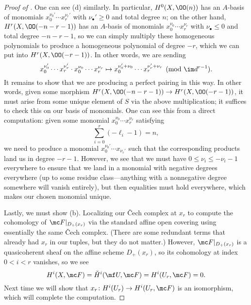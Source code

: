 \documentclass[../notes.tex]{subfiles}
\begin{document}
\begin{proof}[Proof of ]
	One can see (d) similarly. In particular, $H^0(X,\OO(n))$ has an $A$-basis of monomials $x_0^{\nu_0'}\cdots x_r^{\nu_r'}$ with $\nu_\bullet'\ge0$ and total degree $n$; on the other hand, $H^r(X,\OO(-n-r-1))$ has an $A$-basis of monomials $x_0^{\nu_0}\cdots x_r^{\nu_r}$ with $\nu_\bullet\le0$ and total degree $-n-r-1$, so we can simply multiply these homogeneous polynomials to produce a homogeneous polynomial of degree $-r$, which we can put into $H^r(X,\OO(-r-1))$. In other words, we are sending
	\[x_0^{\nu_0'}\cdots x_r^{\nu_r'}\cdot x_0^{\nu_0}\cdots x_r^{\nu_r}\mapsto x_0^{\nu_0'+\nu_0}\cdots x_r^{\nu_r'+\nu_r}\pmod{\im d^{r-1}}.\]
	It remains to show that we are producing a perfect pairing in this way. In other words, given some morphism $H^r(X,\OO(-n-r-1))\to H^r(X,\OO(-r-1))$, it must arise from some unique element of $S$ via the above multiplication; it suffices to check this on our basis of monomials. One can see this from a direct computation: given some monomial $x_0^{\nu_0}\cdots x_r^{\nu_r}$ satisfying
	\[\sum_{i=0}^r(-\ell_i-1)=n,\]
	we need to produce a monomial $x_0^{\nu_0'}\cdots x_{\nu_r'}$ such that the corresponding products land us in degree $-r-1$. However, we see that we must have $0\le\nu_i\le-\nu_i-1$ everywhere to ensure that we land in a monomial with negative degrees everywhere (up to some residue class---anything with a nonnegative degree somewhere will vanish entirely), but then equalities must hold everywhere, which makes our chosen monomial unique.

	Lastly, we must show (b). Localizing our \v Cech complex at $x_r$ to compute the cohomology of $\mc F|_{D_+(x_r)}$ via the standard affine open covering using essentially the same \v Cech complex. (There are some redundant terms that already had $x_r$ in our tuples, but they do not matter.) However, $\mc F|_{D_+(x_r)}$ is a quasicoherent sheaf on the affine scheme $D_+(x_r)$, so its cohomology at index $0<i<r$ vanishes, so we see
	\[H^i(X,\mc F)=\check H^i(\mf U,\mc F)=H^i(U_r,\mc F)=0.\]
	Next time we will show that $x_r\colon H^i(U_r)\to H^i(U_r,\mc F)$ is an isomorphism, which will complete the computation.
\end{proof}
\end{document}
